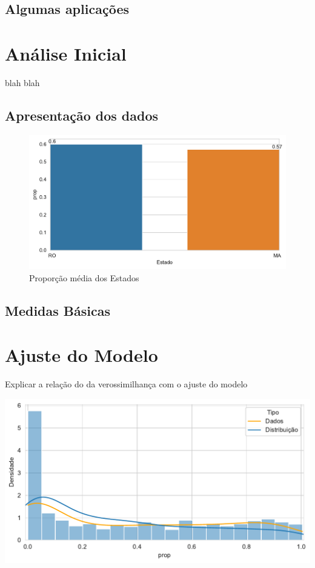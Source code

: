 \documentclass[
]{article}
\begin{document}
\subsection{Algumas aplicações}

\section{\centering Análise Inicial}

blah blah

\subsection{Apresentação dos dados}

\begin{figure}

{\centering \includegraphics{report_files/figure-pdf/fig-states-output-1.pdf}

}

\caption{\label{fig-states}Proporção média dos Estados}

\end{figure}

\subsection{Medidas Básicas}

\section{\centering Ajuste do Modelo}

Explicar a relação do da verossimilhança com o ajuste do modelo

\includegraphics{report_files/figure-pdf/cell-6-output-1.pdf}
\end{document}
